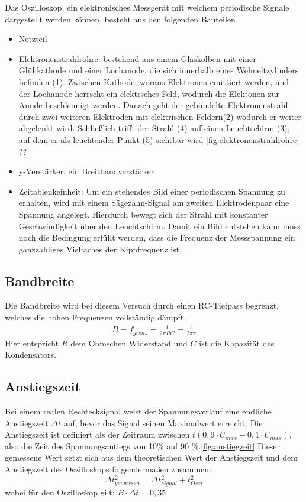 \documentclass{article}
\begin{document}
Das Oszilloskop, ein elektronisches Messgerät mit welchem periodische Signale dargestellt werden können, besteht aus den folgenden Bauteilen
\begin{itemize}
    \item Netzteil
    \item Elektronenstrahlröhre: bestehend aus einem Glaskolben mit einer Glühkathode und einer Lochanode, die sich innerhalb eines Wehneltzylinders befinden (1). Zwischen Kathode, woraus Elektronen emittiert werden, und der Lochanode herrscht ein elektrsches Feld, wodurch die Elektonen zur Anode beschleunigt werden. Danach geht der gebündelte Elektronenstrahl durch zwei weiteren Elektroden mit elektrischen Feldern(2) wodurch er weiter abgelenkt wird. Schließlich trifft der Strahl (4) auf einen Leuchtschirm (3), auf dem er als leuchtender Punkt (5) sichtbar wird \ref{fig:elektronenstrahlröhre} \\
?? %
    
    \item y-Verstärker: ein Breitbandverstärker
    
    \item Zeitablenkeinheit: Um ein stehendes Bild einer periodischen Spannung zu erhalten, wird mit einem Sägezahn-Signal am zweiten Elektrodenpaar eine Spannung angelegt. Hierdurch bewegt sich der Strahl mit konstanter Geschwindigkeit über den Leuchtschirm. Damit ein Bild entstehen kann muss noch die Bedingung erfüllt werden, dass die Frequenz der Messspannung ein ganzzahliges Vielfaches der Kippfrequenz ist.

    
\end{itemize}

\subsection*{Bandbreite}
Die Bandbreite wird bei diesem Versuch durch einen RC-Tiefpass begrenzt, welches die hohen Frequenzen vollständig dämpft.
\begin{align}
  B = f_{grenz}= \frac{1}{2\pi RC}=  \frac{1}{2\pi \tau}
\end{align}
Hier entspricht $R$ dem Ohmschen Widerstand und $C$ ist die Kapazität des Kondensators. 

\subsection*{Anstiegszeit}
Bei einem realen Rechtecksignal weist der Spannungsverlauf eine endliche Anstiegszeit $\Delta t$ auf, bevor das Signal seinen Maximalwert erreicht. Die Anstiegszeit ist definiert als der Zeitraum zwischen  $t(0,9\cdot U_{max}- 0,1\cdot U_{max})$, also die Zeit des Spannungsantiegs von 10$\%$ auf 90 $\%$.\autoref{fig:anstiegzeit} %
Dieser gemessene Wert setzt sich aus dem theoretischen Wert der Anstiegszeit und dem Anstiegszeit des Oszilloskops folgendermaßen zusammen:
\begin{equation}
    \Delta t_{gemessen}^2 = \Delta t_{signal}^2 + t_{Oszi}^2
\end{equation}
wobei für den Oszilloskop gilt: $B \cdot \Delta t = 0,35$
\newpage 
\end{document}
